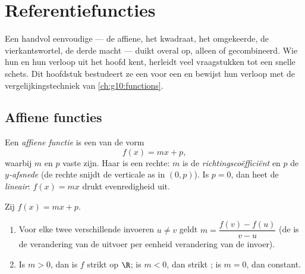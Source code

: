 \chapter{Referentiefuncties}\label{ch:g10:reffunc}

Een handvol eenvoudige  --- de affiene, het kwadraat, het omgekeerde,
de vierkantswortel, de derde macht --- duikt overal op, alleen of gecombineerd.
Wie hun  en hun verloop uit het hoofd kent, herleidt veel vraagstukken
tot een snelle schets. Dit hoofdstuk bestudeert ze een voor een en bewijst hun
verloop met de vergelijkingstechniek van \cref{ch:g10:functions}.

\section{Affiene functies}

\begin{definition}\label{def:g10:reffunc:affine}
Een \emph{affiene functie} is een  van de vorm
\[
f(x) = mx + p,
\]
waarbij $m$ en $p$ vaste  zijn. Haar  is een rechte:
$m$ is de \emph{richtingscoëfficiënt} en $p$ de
\emph{$y$-afsnede} (de rechte snijdt de
verticale as in $(0, p)$). Is $p = 0$, dan heet de  \emph{lineair}:
$f(x) = mx$ drukt evenredigheid uit.
\end{definition}

\begin{proposition}\label{prop:g10:reffunc:affine}
Zij $f(x) = mx + p$.
\begin{enumerate}
  \item Voor elke twee verschillende invoeren $u \neq v$ geldt
        $m = \dfrac{f(v) - f(u)}{v - u}$ (de  is de
        verandering van de uitvoer per eenheid verandering van de invoer).
  \item Is $m > 0$, dan is $f$ strikt  op $\R$; is $m < 0$, dan
        strikt ; is $m = 0$, dan constant.
\end{enumerate}
\end{proposition}

